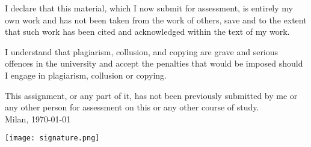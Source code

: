 I declare that this material, which I now submit for assessment, is entirely my own work and has not been taken from the work of others, save and to the extent that such work has been cited and acknowledged within the text of my work. 

I understand that plagiarism, collusion, and copying are grave and serious offences in the university and accept the penalties that would be imposed should I engage in plagiarism, collusion or copying. 

This assignment, or any part of it, has not been previously submitted by me or any other person for assessment on this or any other course of study.\\

Milan, \today

\vspace{0.2cm} 

\texttt{[image: signature.png]}